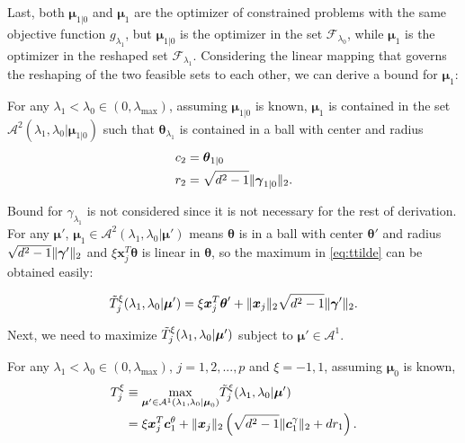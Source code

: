Last, both $\boldsymbol\mu_{1|0}$ and $\boldsymbol\mu_1$ are the optimizer of constrained problems with the same objective function $g_{\lambda_1}$, but $\boldsymbol\mu_{1|0}$ is the optimizer in the set $\mathcal{F}_{\lambda_0}$, while $\boldsymbol\mu_1$ is the optimizer in the reshaped set $\mathcal{F}_{\lambda_1}$. Considering the linear mapping that governs the reshaping of the two feasible sets to each other, we can derive a bound for $\boldsymbol\mu_1$:
\begin{theorem}
    \label{thm:1.3.alt}
    For any $\lambda_1<\lambda_{0}\in (0,\lambda_\textrm{max})$, assuming $\boldsymbol\mu_{1|0}$ is known, $\boldsymbol\mu_1$ is contained in the set $\mathcal{A}^2(\lambda_1,\lambda_0|\boldsymbol\mu_{1|0})$ such that $\boldsymbol\theta_{\lambda_1}$ is contained in a ball with center and radius
    \begin{gather}
        \begin{aligned}
            c_2&=\boldsymbol\theta_{1|0}\\
            r_2&=\sqrt{d^2-1}\lVert\boldsymbol\gamma_{1|0}\rVert_2.
        \end{aligned}
    \end{gather}
\end{theorem}
Bound for $\gamma_{\lambda_1}$ is not considered since it is not necessary for the rest of derivation. For any $\boldsymbol\mu'$, $\boldsymbol\mu_1\in\mathcal{A}^2(\lambda_1,\lambda_0|\boldsymbol\mu')$ means $\boldsymbol\theta$ is in a ball with center $\boldsymbol\theta'$ and radius $\sqrt{d^2-1}\lVert\boldsymbol\gamma'\rVert_2$ and $\xi \boldsymbol x_j^T\boldsymbol\theta$ is linear in $\boldsymbol\theta$, so the maximum in \eqref{eq:ttilde} can be obtained easily:

\begin{equation}
    \label{eq:ttildexi.alt}
    \Tilde{T}^\xi_j(\lambda_1,\lambda_0|\boldsymbol\mu')=\xi \boldsymbol x_j^T\boldsymbol\theta'+\lVert\boldsymbol x_j\rVert_2\sqrt{d^2-1}\lVert\boldsymbol\gamma'\rVert_2.
\end{equation}

Next, we need to maximize $\Tilde{T}^\xi_j(\lambda_1,\lambda_0|\boldsymbol\mu')$ subject to $\boldsymbol\mu'\in\mathcal{A}^1$.

\begin{theorem}
    \label{thm:2.1.alt}
    For any $\lambda_1<\lambda_{0}\in (0,\lambda_\textrm{max})$, $j=1,2,...,p$ and $\xi=-1,1$, assuming $\boldsymbol\mu_0$ is known,
    \begin{gather}
        \begin{aligned}
            T^\xi_j&\equiv\underset{\boldsymbol\mu'\in\mathcal{A}^1(\lambda_1,\lambda_0|\boldsymbol\mu_0)}{\mathrm{max}}\Tilde{T}^\xi_j(\lambda_1,\lambda_0|\boldsymbol\mu')\\
            &=\xi \boldsymbol x_j^T \boldsymbol c_1^\theta+\lVert\boldsymbol x_j\rVert_2\left(\sqrt{d^2-1}\lVert\boldsymbol c_1^\gamma\rVert_2+dr_1\right).
        \end{aligned}
    \end{gather}
\end{theorem}

